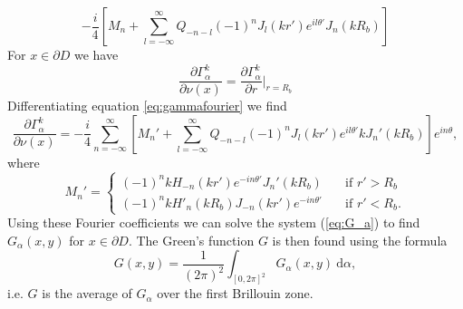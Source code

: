 \documentclass[a4paper]{article}
\theoremstyle{definition}
\newcommand{\dx}{\: \mathrm{d}}
\newcommand{\eqnref}[1]{(\ref {#1})}
\begin{document}
\begin{equation*}
-\frac{i}{4}\left[M_n + \sum_{l=-\infty}^\infty Q_{-n-l} (-1)^nJ_l(kr')e^{il\theta'}J_n(kR_b)\right]
\end{equation*}
For $x\in \partial D$ we have
\begin{equation*}
\frac{\partial \Gamma_\alpha^k}{\partial \nu(x)} = \frac{\partial \Gamma_\alpha^k}{\partial r} \Bigg|_{r=R_b}
\end{equation*} 
Differentiating equation \ref{eq:gammafourier} we find
\begin{equation*}
\frac{\partial \Gamma_\alpha^k}{\partial \nu(x)} = -\frac{i}{4}\sum_{n=-\infty}^\infty\left[ M_n' + \sum_{l=-\infty}^\infty Q_{-n-l} (-1)^nJ_l(kr')e^{il\theta'}kJ_n'(kR_b)\right]e^{in\theta},
\end{equation*}
where
\begin{equation*}
M_n' = \begin{cases}
(-1)^nkH_{-n}(kr')e^{-in\theta'}J_n'(kR_b) \quad &\text{if } r' > R_b \\
(-1)^nkH'_{n}(kR_b)J_{-n}(kr')e^{-in\theta'} \quad &\text{if } r' < R_b.
\end{cases}
\end{equation*}
Using these Fourier coefficients we can solve the system \eqnref{eq:G_a} to find $G_\alpha(x,y)$ for $x\in \partial D$. The Green's function $G$ is then found using the formula
\begin{equation*}
G(x,y) = \frac{1}{(2\pi)^2}\int_{[0,2\pi]^2} G_\alpha(x,y) \dx \alpha,
\end{equation*}
i.e. $G$ is the average of $G_\alpha$ over the first Brillouin zone. 


{}

\end{document}
